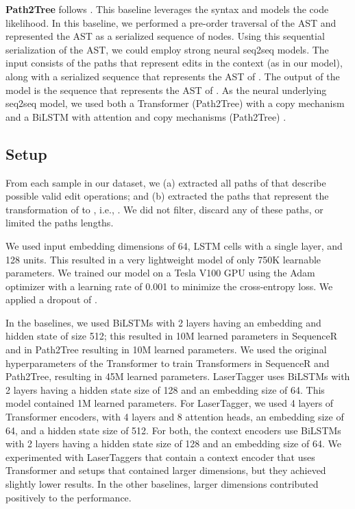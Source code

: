 \textbf{Path2Tree} follows \citet{aharoni-goldberg-2017-towards}. This baseline leverages the syntax and models the code likelihood. In this baseline, we performed a pre-order traversal of the AST and represented the AST as a serialized sequence of nodes. Using this sequential serialization of the AST, we could employ strong neural seq2seq models. The input consists of the paths that represent edits in the context (as in our model), along with a serialized sequence that represents the AST of . The output of the model is the sequence that represents the AST of . 
As the neural underlying seq2seq model, we used both a Transformer (Path2Tree) with a copy mechanism and a BiLSTM with attention and copy mechanisms (Path2Tree) .


\subsection{Setup}
From each sample in our dataset, we (a) extracted all paths of 
 that describe possible valid edit operations; and (b) extracted the paths that represent the transformation of  to , i.e., . We did not filter, discard any of these paths, or limited the paths lengths.

We used input embedding dimensions of 64, LSTM cells with a single layer, and 128 units. This resulted in a very lightweight model of only 750K learnable parameters. 
We trained our model on a Tesla V100 GPU using the Adam optimizer \citep{kingma2014method} with a learning rate of 0.001 to minimize the cross-entropy loss. We applied a dropout \citep{DBLP:journals/corr/abs-1207-0580} of . 


In the baselines, 
we used BiLSTMs with 2 layers having an embedding and hidden state of size 512; this resulted in 10M learned parameters in SequenceR and in Path2Tree resulting in 10M learned parameters. We used the original hyperparameters of the Transformer \citep{NIPS2017_7181} to train Transformers in SequenceR and Path2Tree, resulting in 45M learned parameters. 
LaserTagger uses BiLSTMs with 2 layers having a hidden state size of 128 and an embedding size of 64. This model contained 1M learned parameters. For LaserTagger, we used 4 layers of Transformer encoders, with 4 layers and 8 attention heads, an embedding size of 64, and a hidden state size of 512. For both, the context encoders use BiLSTMs with 2 layers having a hidden state size of 128 and an embedding size of 64. We experimented with LaserTaggers 
that contain a context encoder that uses Transformer and setups
that contained larger dimensions, but they achieved slightly lower results. In the other baselines, larger dimensions contributed positively to the performance.


